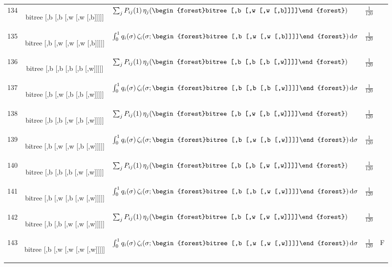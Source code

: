 \documentclass[10pt,a4paper]{article}
\newcommand{\btree}[1]{\begin{forest}bitree #1\end{forest}}
\newcommand{\dd}{\,\mathrm{d}}
\begin{document}
{\begin{longtable}{rclll}
134 & \btree{[,b [,b [,w [,w [,b]]]]]} & $\sum_j P_{ij}(1)\,\eta_j(\btree{[,b [,w [,w [,b]]]]})$ & $\frac1{120}$ & \\[3pt]
135 & \btree{[,b [,w [,w [,w [,b]]]]]} & $\int_0^1 q_i(\sigma)\,\zeta_i(\sigma;\btree{[,b [,w [,w [,b]]]]})\dd\sigma$ & $\frac1{120}$ & \\[3pt]
136 & \btree{[,b [,b [,b [,b [,w]]]]]} & $\sum_j P_{ij}(1)\,\eta_j(\btree{[,b [,b [,b [,w]]]]})$ & $\frac1{120}$ & \\[3pt]
137 & \btree{[,b [,w [,b [,b [,w]]]]]} & $\int_0^1 q_i(\sigma)\,\zeta_i(\sigma;\btree{[,b [,b [,b [,w]]]]})\dd\sigma$ & $\frac1{120}$ & \\[3pt]
138 & \btree{[,b [,b [,w [,b [,w]]]]]} & $\sum_j P_{ij}(1)\,\eta_j(\btree{[,b [,w [,b [,w]]]]})$ & $\frac1{120}$ & \\[3pt]
139 & \btree{[,b [,w [,w [,b [,w]]]]]} & $\int_0^1 q_i(\sigma)\,\zeta_i(\sigma;\btree{[,b [,w [,b [,w]]]]})\dd\sigma$ & $\frac1{120}$ & \\[3pt]
140 & \btree{[,b [,b [,b [,w [,w]]]]]} & $\sum_j P_{ij}(1)\,\eta_j(\btree{[,b [,b [,w [,w]]]]})$ & $\frac1{120}$ & \\[3pt]
141 & \btree{[,b [,w [,b [,w [,w]]]]]} & $\int_0^1 q_i(\sigma)\,\zeta_i(\sigma;\btree{[,b [,b [,w [,w]]]]})\dd\sigma$ & $\frac1{120}$ & \\[3pt]
142 & \btree{[,b [,b [,w [,w [,w]]]]]} & $\sum_j P_{ij}(1)\,\eta_j(\btree{[,b [,w [,w [,w]]]]})$ & $\frac1{120}$ & \\[3pt]
143 & \btree{[,b [,w [,w [,w [,w]]]]]} & $\int_0^1 q_i(\sigma)\,\zeta_i(\sigma;\btree{[,b [,w [,w [,w]]]]})\dd\sigma$ & $\frac1{120}$ & F\\[3pt]
\end{longtable}}
\end{document}
